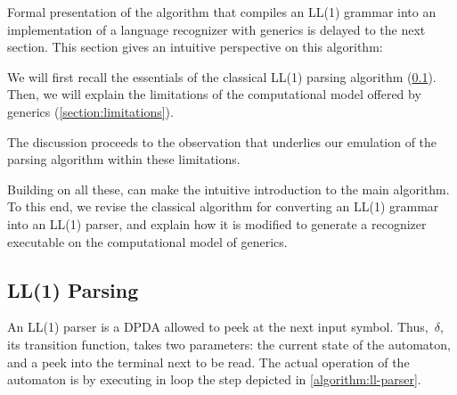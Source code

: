 Formal presentation of the algorithm that compiles an LL(1) grammar into an implementation of a
  language recognizer with \Java generics
  is delayed to the next section.
This section gives an intuitive perspective on this algorithm:

We will first recall the essentials of the classical LL(1) parsing algorithm (\cref{section:essentials}).
Then, we will explain the limitations of the computational model
offered by \Java generics (\cref{section:limitations}).

The discussion proceeds to the observation
  that underlies our emulation of the parsing algorithm
  within these limitations.

Building on all these,  can
  make the intuitive introduction to the main algorithm.
To this end, we revise the classical algorithm for converting
  an LL(1) grammar into an LL(1) parser, and explain
  how it is modified to generate a recognizer executable
  on the computational model of \Java generics.

\subsection{LL(1) Parsing}
\label{section:essentials}
An LL(1) parser is a DPDA allowed to peek at the next input symbol.
Thus,~$δ$, its transition function, takes two parameters: the current state of
the automaton, and a peek into the terminal next to be read.
The actual operation of the automaton
  is by executing in loop the step
  depicted in \cref{algorithm:ll-parser}.

